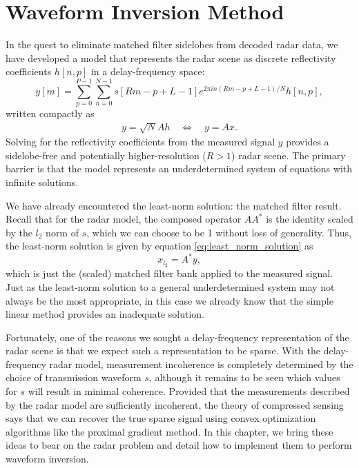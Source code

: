 \chapter{Waveform Inversion Method}
\label{waveform_inversion}
In the quest to eliminate matched filter sidelobes from decoded radar data, we have developed a model that represents the radar scene as discrete reflectivity coefficients $h[n,p]$ in a delay-frequency space:
\begin{equation}
 y[m] = \sum_{p=0}^{P-1} \sum_{n=0}^{N-1} s[Rm-p+L-1] e^{2 \pi i n(Rm-p+L-1)/N} h[n,p],
\end{equation}
written compactly as
\begin{align}
 y = \sqrt{N} A h \quad \Leftrightarrow \quad y = A x.
\end{align}
Solving for the reflectivity coefficients from the measured signal $y$ provides a sidelobe-free and potentially higher-resolution ($R > 1$) radar scene. The primary barrier is that the model represents an underdetermined system of equations with infinite solutions.

We have already encountered the least-norm solution: the matched filter result. Recall that for the radar model, the composed operator $AA^*$ is the identity scaled by the $l_2$ norm of $s$, which we can choose to be 1 without loss of generality. Thus, the least-norm solution is given by equation \eqref{eq:least_norm_solution} as
\begin{equation}
 x_{l_2} = A^*y,
\end{equation}
which is just the (scaled) matched filter bank applied to the measured signal. Just as the least-norm solution to a general underdetermined system may not always be the most appropriate, in this case we already know that the simple linear method provides an inadequate solution.

Fortunately, one of the reasons we sought a delay-frequency representation of the radar scene is that we expect such a representation to be sparse. With the delay-frequency radar model, measurement incoherence is completely determined by the choice of transmission waveform $s$, although it remains to be seen which values for $s$ will result in minimal coherence. Provided that the measurements described by the radar model are sufficiently incoherent, the theory of compressed sensing says that we can recover the true sparse signal using convex optimization algorithms like the proximal gradient method. In this chapter, we bring these ideas to bear on the radar problem and detail how to implement them to perform waveform inversion.

